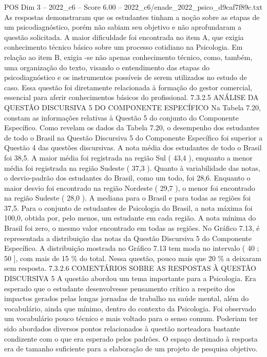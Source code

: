 \begin{textsample}{POS Dim 3 – 2022\_c6 – Score 6.00 – 2022\_c6/enade\_2022\_psico\_d9caf7f89c.txt}
As respostas demonstraram que os estudantes tinham a noção sobre as etapas de um psicodiagnóstico, porém não sabiam seu objetivo e não aprofundaram a questão solicitada.
A maior dificuldade foi encontrada no item A, que exigia conhecimento técnico básico sobre um processo cotidiano na Psicologia.
Em relação ao item B, exigia -se não apenas conhecimento técnico, como, também, uma organização do texto, visando o entendimento das etapas do psicodiagnóstico e os instrumentos possíveis de serem utilizados no estudo de caso.
Essa questão foi diretamente relacionada à formação do gestor comercial, essencial para aferir conhecimentos básicos do profissional. 7.3.2.5 ANÁLISE DA QUESTÃO DISCURSIVA 5 DO COMPONENTE ESPECÍFICO Na Tabela 7.20, constam as informações relativas à Questão 5 do conjunto do Componente Específico.
Como revelam os dados da Tabela 7.20, o desempenho dos estudantes de todo o Brasil na Questão Discursiva 5 do Componente Específico foi superior a Questão 4 das questões discursivas.
A nota média dos estudantes de todo o Brasil foi 38,5.
A maior média foi registrada na região Sul ( 43,4 ), enquanto a menor média foi registrada na região Sudeste ( 37,3 ).
Quanto à variabilidade das notas, o desvio-padrão dos estudantes do Brasil, como um todo, foi 28,6.
Enquanto o maior desvio foi encontrado na região Nordeste ( 29,7 ), o menor foi encontrado na região Sudeste ( 28,0 ).
A mediana para o Brasil e para todas as regiões foi 37,5.
Para o conjunto de estudantes de Psicologia do Brasil, a nota máxima foi 100,0, obtida por, pelo menos, um estudante em cada região.
A nota mínima do Brasil foi zero, o mesmo valor encontrado em todas as regiões.
No Gráfico 7.13, é representada a distribuição das notas da Questão Discursiva 5 do Componente Específico.
A distribuição mostrada no Gráfico 7.13 tem moda no intervalo ( 40 ; 50 ], com mais de 15 \% do total.
Nessa questão, pouco mais que 20 \% a deixaram sem resposta. 7.3.2.6 COMENTÁRIOS SOBRE AS RESPOSTAS À QUESTÃO DISCURSIVA 5 A questão abordou um tema importante para a Psicologia.
Era esperado que o estudante desenvolvesse pensamento crítico a respeito dos impactos gerados pelas longas jornadas de trabalho na saúde mental, além do vocabulário, ainda que mínimo, dentro do contexto da Psicologia.
Foi observado um vocabulário pouco técnico e mais voltado para o senso comum.
Poderiam ter sido abordados diversos pontos relacionados à questão norteadora bastante condizente com o que era esperado pelos padrões.
O espaço destinado à resposta era de tamanho suficiente para a elaboração de um projeto de pesquisa objetivo.

\end{textsample}
